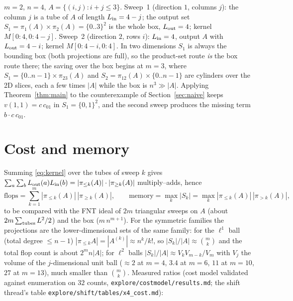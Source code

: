\documentclass[11pt]{article}
\newcommand{\pr}[1]{\pi_{#1}}
\begin{document}
\begin{example}[2D triangle]
$m=2$, $n=4$, $A=\{(i,j): i+j\le3\}$. Sweep~1 (direction $1$, columns $j$): the column $j$ is a tube of $A$ of length
$L_{\rm in}=4-j$; the output set $S_1=\pr{1}(A)\times\pr{2}(A)=\{0..3\}^2$ is the whole box, $L_{\rm out}=4$; kernel
$M[0{:}4,0{:}4-j]$. Sweep~2 (direction $2$, rows $i$): $L_{\rm in}=4$, output $A$ with $L_{\rm out}=4-i$; kernel $M[0{:}4-i,0{:}4]$.
In two dimensions $S_1$ is always the bounding box (both projections are full), so the product-set route
\emph{is} the box route there; the saving over the box begins at $m=3$, where $S_1=\{0..n-1\}\times\pr{23}(A)$ and
$S_2=\pr{12}(A)\times\{0..n-1\}$ are cylinders over the 2D slices, each a few times $|A|$ while the box is
$n^3\gg|A|$. Applying Theorem~\ref{thm:main} to the counterexample of Section~\ref{sec:naive} keeps $v(1,1)=c\,c_{01}$
in $S_1=\{0,1\}^2$, and the second sweep produces the missing term $b\cdot c\,c_{01}$.
\end{example}

\section{Cost and memory}\label{sec:cost}
Summing \eqref{eq:kernel} over the tubes of sweep $k$ gives $\sum_{a}\sum_{b}L_{\rm out}(a)L_{\rm in}(b)=|\pr{\le k}(A)|\cdot|\pr{\ge k}(A)|$
multiply--adds, hence
\begin{equation}\label{eq:cost}
 \mathrm{flops}=\sum_{k=1}^{m}|\pr{\le k}(A)|\,|\pr{\ge k}(A)|,\qquad
 \mathrm{memory}=\max_{k}|S_k|=\max_k|\pr{\le k}(A)|\,|\pr{>k}(A)|,
\end{equation}
to be compared with the FNT ideal of $2m$ triangular sweeps on $A$ (about $2m\sum_{\rm tubes}L^2/2$) and the box
($m\,n^{m+1}$). For the symmetric families the projections are the lower-dimensional sets of the same family:
for the $\ell^1$ ball (total degree $\le n-1$) $|\pr{\le k}A|=|A^{(k)}|\approx n^k/k!$, so $|S_k|/|A|\approx\binom{m}{k}$ and the
total flop count is about $2^m n|A|$; for $\ell^2$ balls $|S_k|/|A|\approx V_kV_{m-k}/V_m$ with $V_j$ the volume of the
$j$-dimensional unit ball ($\approx2$ at $m=4$, $3.4$ at $m=6$, $11$ at $m=10$, $27$ at $m=13$), much smaller than
$\binom{m}{k}$. Measured ratios (cost model validated against enumeration on $32$ counts,
\texttt{explore/costmodel/results.md}; the shift thread's table \texttt{explore/shift/tables/x4\_cost.md}):
\end{document}
